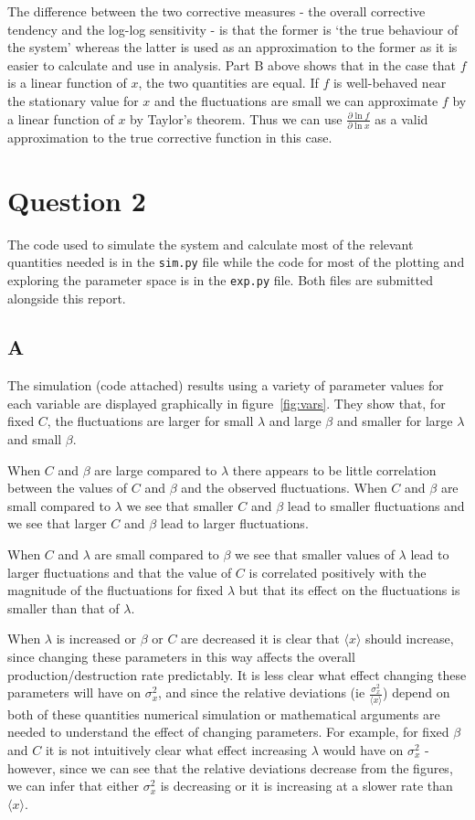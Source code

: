 \documentclass[a4paper,12pt]{article}
\begin{document}
The difference between the two corrective measures - the overall corrective tendency and the log-log sensitivity - is that the former is `the true behaviour of the system' whereas the latter is used as an approximation to the former as it is easier to calculate and use in analysis. Part B above shows that in the case that $f$ is a linear function of $x$, the two quantities are equal. If $f$ is well-behaved near the stationary value for $x$ and the fluctuations are small we can approximate $f$ by a linear function of $x$ by Taylor's theorem. Thus we can use $\frac{\partial \ln f}{\partial \ln x}$ as a valid approximation to the true corrective function in this case.


\section*{Question 2}
The code used to simulate the system and calculate most of the relevant quantities needed is in the \texttt{sim.py} file while the code for most of the plotting and exploring the parameter space is in the \texttt{exp.py} file. Both files are submitted alongside this report.

\subsection*{A}
The simulation (code attached) results using a variety of parameter values for each variable are displayed graphically in figure~\ref{fig:vars}. They show that, for fixed $C$, the fluctuations are larger for small $\lambda$ and large $\beta$ and smaller for large $\lambda$ and small $\beta$. 

When $C$ and $\beta$ are large compared to $\lambda$ there appears to be little correlation between the values of $C$ and $\beta$ and the observed fluctuations. When $C$ and $\beta$ are small compared to $\lambda$ we see that smaller $C$ and $\beta$ lead to smaller fluctuations and we see that larger $C$ and $\beta$ lead to larger fluctuations.

When $C$ and $\lambda$ are small compared to $\beta$ we see that smaller values of $\lambda$ lead to larger fluctuations and that the value of $C$ is correlated positively with the magnitude of the fluctuations for fixed $\lambda$ but that its effect on the fluctuations is smaller than that of $\lambda$.

When $\lambda$ is increased or $\beta$ or $C$ are decreased it is clear that $\langle x \rangle$ should increase, since changing these parameters in this way affects the overall production/destruction rate predictably. It is less clear what effect changing these parameters will have on $\sigma^2_x$, and since the relative deviations (ie $\frac{\sigma^2_x}{\langle x \rangle}$) depend on both of these quantities numerical simulation or mathematical arguments are needed to understand the effect of changing parameters. For example, for fixed $\beta$ and $C$ it is not intuitively clear what effect increasing $\lambda$ would have on $\sigma^2_x$ - however, since we can see that the relative deviations decrease from the figures, we can infer that either $\sigma^2_x$ is decreasing or it is increasing at a slower rate than $\langle x \rangle$.
\end{document}
